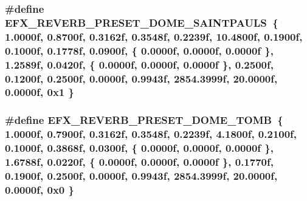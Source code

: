 \subsubsection[{\texorpdfstring{E\+F\+X\+\_\+\+R\+E\+V\+E\+R\+B\+\_\+\+P\+R\+E\+S\+E\+T\+\_\+\+D\+O\+M\+E\+\_\+\+S\+A\+I\+N\+T\+P\+A\+U\+LS}{EFX_REVERB_PRESET_DOME_SAINTPAULS}}]{\setlength{\rightskip}{0pt plus 5cm}\#define E\+F\+X\+\_\+\+R\+E\+V\+E\+R\+B\+\_\+\+P\+R\+E\+S\+E\+T\+\_\+\+D\+O\+M\+E\+\_\+\+S\+A\+I\+N\+T\+P\+A\+U\+LS~\{ 1.\+0000f, 0.\+8700f, 0.\+3162f, 0.\+3548f, 0.\+2239f, 10.\+4800f, 0.\+1900f, 0.\+1000f, 0.\+1778f, 0.\+0900f, \{ 0.\+0000f, 0.\+0000f, 0.\+0000f \}, 1.\+2589f, 0.\+0420f, \{ 0.\+0000f, 0.\+0000f, 0.\+0000f \}, 0.\+2500f, 0.\+1200f, 0.\+2500f, 0.\+0000f, 0.\+9943f, 2854.\+3999f, 20.\+0000f, 0.\+0000f, 0x1 \}}\hypertarget{efx-presets_8h_a86a0f934e539989d9c39b390fd265e51}{}\label{efx-presets_8h_a86a0f934e539989d9c39b390fd265e51}
\subsubsection[{\texorpdfstring{E\+F\+X\+\_\+\+R\+E\+V\+E\+R\+B\+\_\+\+P\+R\+E\+S\+E\+T\+\_\+\+D\+O\+M\+E\+\_\+\+T\+O\+MB}{EFX_REVERB_PRESET_DOME_TOMB}}]{\setlength{\rightskip}{0pt plus 5cm}\#define E\+F\+X\+\_\+\+R\+E\+V\+E\+R\+B\+\_\+\+P\+R\+E\+S\+E\+T\+\_\+\+D\+O\+M\+E\+\_\+\+T\+O\+MB~\{ 1.\+0000f, 0.\+7900f, 0.\+3162f, 0.\+3548f, 0.\+2239f, 4.\+1800f, 0.\+2100f, 0.\+1000f, 0.\+3868f, 0.\+0300f, \{ 0.\+0000f, 0.\+0000f, 0.\+0000f \}, 1.\+6788f, 0.\+0220f, \{ 0.\+0000f, 0.\+0000f, 0.\+0000f \}, 0.\+1770f, 0.\+1900f, 0.\+2500f, 0.\+0000f, 0.\+9943f, 2854.\+3999f, 20.\+0000f, 0.\+0000f, 0x0 \}}\hypertarget{efx-presets_8h_a8172efac7fcdf447caf74b3588121f05}{}\label{efx-presets_8h_a8172efac7fcdf447caf74b3588121f05}
